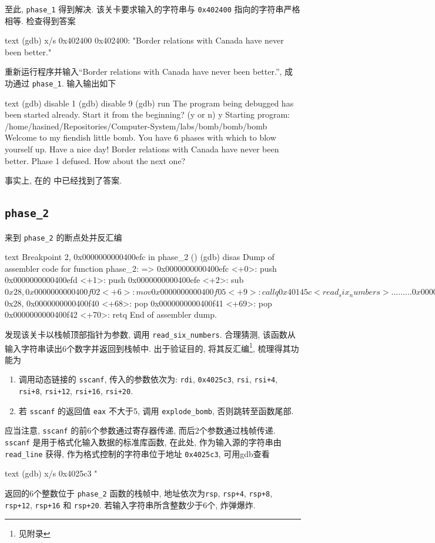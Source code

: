 至此, \verb|phase_1| 得到解决. 该关卡要求输入的字符串与 \verb|0x402400| 指向的字符串严格相等. 检查得到答案
\begin{code}{text}
(gdb) x/s 0x402400
0x402400:       "Border relations with Canada have never been better."
\end{code}
重新运行程序并输入“Border relations with Canada have never been better.”, 成功通过 \verb|phase_1|. 输入输出如下
\begin{code}{text}
(gdb) disable 1
(gdb) disable 9
(gdb) run
The program being debugged has been started already.
Start it from the beginning? (y or n) y
Starting program: /home/hasined/Repositories/Computer-System/labs/bomb/bomb/bomb
Welcome to my fiendish little bomb. You have 6 phases with
which to blow yourself up. Have a nice day!
Border relations with Canada have never been better.
Phase 1 defused. How about the next one?
\end{code}
事实上, 在的  中已经找到了答案.

\subsection{\texttt{phase_2}}

来到 \verb|phase_2| 的断点处并反汇编
\begin{code}{text}
Breakpoint 2, 0x0000000000400efc in phase_2 ()
(gdb) disas
Dump of assembler code for function phase_2:
=> 0x0000000000400efc <+0>:     push   %
   0x0000000000400efd <+1>:     push   %
   0x0000000000400efe <+2>:     sub    $0x28,%
   0x0000000000400f02 <+6>:     mov    %
   0x0000000000400f05 <+9>:     callq  0x40145c <read_six_numbers>
   ...                          ...    ...
   0x0000000000400f3c <+64>:    add    $0x28,%
   0x0000000000400f40 <+68>:    pop    %
   0x0000000000400f41 <+69>:    pop    %
   0x0000000000400f42 <+70>:    retq
End of assembler dump.
\end{code}
发现该关卡以栈帧顶部指针为参数, 调用 \verb|read_six_numbers|. 合理猜测, 该函数从输入字符串读出6个数字并返回到栈帧中. 出于验证目的, 将其反汇编\footnote{见附录 }, 梳理得其功能为
\begin{enumerate}[noitemsep]
    \item 调用动态链接的 \verb|sscanf|, 传入的参数依次为: \verb|rdi|, \verb|0x4025c3|, \verb|rsi|, \verb|rsi+4|, \verb|rsi+8|, \verb|rsi+12|, \verb|rsi+16|, \verb|rsi+20|.
    \item 若 \verb|sscanf| 的返回值 \verb|eax| 不大于5, 调用 \verb|explode_bomb|, 否则跳转至函数尾部.
\end{enumerate}
应当注意, \verb|sscanf| 的前6个参数通过寄存器传递, 而后2个参数通过栈帧传递. \verb|sscanf| 是用于格式化输入数据的标准库函数, 在此处, 作为输入源的字符串由 \verb|read_line| 获得, 作为格式控制的字符串位于地址 \verb|0x4025c3|, 可用gdb查看
\begin{code}{text}
    (gdb) x/s 0x4025c3
    "%
\end{code}
返回的6个整数位于 \verb|phase_2| 函数的栈帧中, 地址依次为\verb|rsp|, \verb|rsp+4|, \verb|rsp+8|, \verb|rsp+12|, \verb|rsp+16| 和 \verb|rsp+20|. 若输入字符串所含整数少于6个, 炸弹爆炸. 

